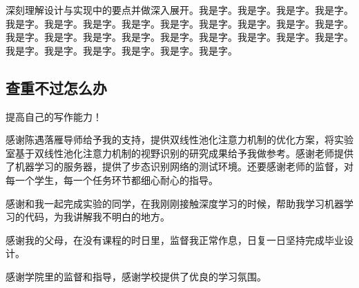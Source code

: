\documentclass[supercite]{Experimental_Report}
\theoremstyle{definition}
\begin{document}
深刻理解设计与实现中的要点并做深入展开。我是字。我是字。我是字。我是字。我是字。我是字。我是字。我是字。我是字。我是字。我是字。我是字。我是字。我是字。我是字。我是字。我是字。我是字。我是字。我是字。我是字。我是字。我是字。我是字。我是字。我是字。我是字。我是字。

\subsection{查重不过怎么办}

提高自己的写作能力！

\newpage

\begin{thankpage}

感谢陈遇落雁导师给予我的支持，提供双线性池化注意力机制的优化方案，将实验室基于双线性池化注意力机制的视野识别的研究成果给予我做参考。感谢老师提供了机器学习的服务器，提供了步态识别网络的测试环境。还要感谢老师的监督，对每一个学生，每一个任务环节都细心耐心的指导。

感谢和我一起完成实验的同学，在我刚刚接触深度学习的时候，帮助我学习机器学习的代码，为我讲解我不明白的地方。

感谢我的父母，在没有课程的时日里，监督我正常作息，日复一日坚持完成毕业设计。

感谢学院里的监督和指导，感谢学校提供了优良的学习氛围。


\end{thankpage}

\nocite{*} %



\end{document}
